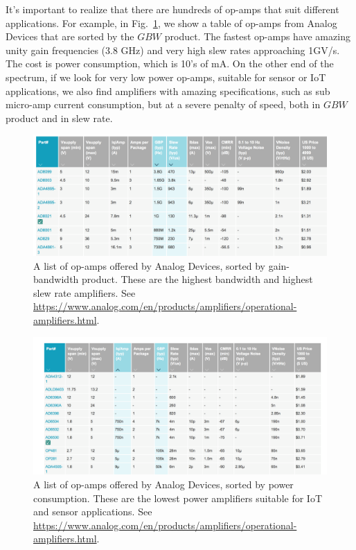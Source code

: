 It's important to realize that there are hundreds of op-amps that suit different applications.  For example, in Fig.~\ref{fig:opamp_table.png}, we show a table of op-amps from Analog Devices that are sorted by the $GBW$ product.  The fastest op-amps have amazing unity gain frequencies (3.8 GHz) and very high slew rates approaching 1GV/s.  The cost is power consumption, which is 10's of mA.  On the other end of the spectrum, if we look for very low power op-amps, suitable for sensor or IoT applications, we also find amplifiers with amazing specifications, such as sub micro-amp current consumption, but at a severe penalty of speed, both in $GBW$ product and in slew rate.  
\begin{figure}[tb]
\centering
\includegraphics[width=\columnwidth]{opamp_table.png}
\caption{A list of op-amps offered by Analog Devices, sorted by gain-bandwidth product.  These are the highest bandwidth and highest slew rate amplifiers.  See \url{https://www.analog.com/en/products/amplifiers/operational-amplifiers.html}.} \label{fig:opamp_table.png}
\end{figure}
\begin{figure}[tb]
\centering
\includegraphics[width=\columnwidth]{opamp_lowpower.png}
\caption{A list of op-amps offered by Analog Devices, sorted by power consumption.  These are the lowest power amplifiers suitable for IoT and sensor applications.  See \url{https://www.analog.com/en/products/amplifiers/operational-amplifiers.html}.} \label{fig:opamp_lowpower.png}
\end{figure}
